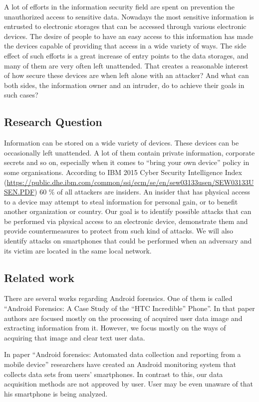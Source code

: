 A lot of efforts in the information security field are spent on prevention the unauthorized access to sensitive data. Nowadays the most sensitive information is entrusted to electronic storages that can be accessed through various electronic devices. The desire of people to have an easy access to this information has made the devices capable of providing that access in a wide variety of ways. The side effect of such efforts is a great increase of entry points to the data storages, and many of them are very often left unattended. That creates a reasonable interest of how secure these devices are when left alone with an attacker? And what can both sides, the information owner and an intruder, do to achieve their goals in such cases?


\subsection{Research Question}

Information can be stored on a wide variety of devices. These devices can be occasionally  left unattended. A lot of them contain private information, corporate secrets and so on, especially when it comes to “bring your own device” policy in some organisations. According to  IBM 2015 Cyber Security Intelligence Index (\url{https://public.dhe.ibm.com/common/ssi/ecm/se/en/sew03133usen/SEW03133USEN.PDF}) 60 \% of all attackers are insiders. An insider that has physical access to a device may attempt to steal information for personal gain, or to benefit another organization or country. Our goal is to identify possible attacks that can be performed via physical access to an electronic device, demonstrate them and provide countermeasures to protect from such kind of attacks. We will also identify attacks on smartphones that could be performed when an adversary and its victim are located in the same local network.


\subsection{Related work}

There are several works regarding Android forensics. One of them is called “Android Forensics: A Case Study of the “HTC Incredible” Phone”. In that paper authors are focused mostly on the processing of acquired user data image and extracting information from it. However, we focus mostly on the ways of acquiring that image and clear text user data.

In paper “Android forensics: Automated data collection and reporting from a mobile device” researchers have created an Android monitoring system that collects data sets from users’ smartphones. In contrast to this, our data acquisition methods are not approved by user. User may be even unaware of that his smartphone is being analyzed.

